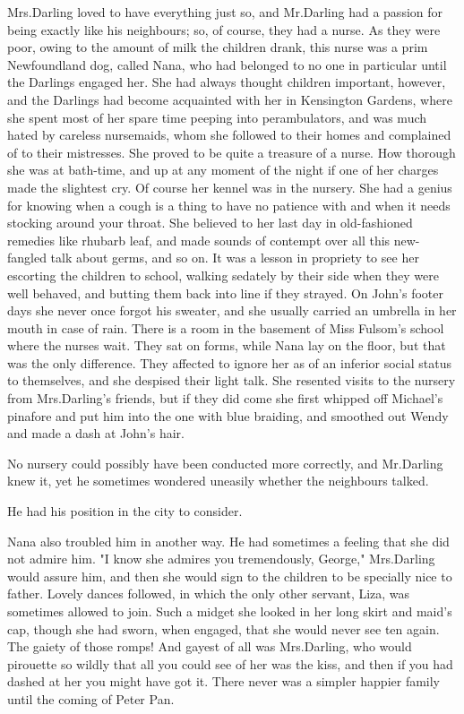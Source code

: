 Mrs.\@ Darling loved to have everything just so,
and Mr.\@ Darling had a passion for being exactly like his neighbours;
so, of course, they had a nurse.
As they were poor, owing to the amount of milk the children drank,
this nurse was a prim Newfoundland dog, called Nana,
who had belonged to no one in particular until the Darlings engaged her.
She had always thought children important, however,
and the Darlings had become acquainted with her in Kensington Gardens,
where she spent most of her spare time peeping into perambulators,
and was much hated by careless nursemaids,
whom she followed to their homes and complained of to their mistresses.
She proved to be quite a treasure of a nurse.
How thorough she was at bath-time,
and up at any moment of the night if one of her charges made the slightest cry.
Of course her kennel was in the nursery.
She had a genius for knowing when a cough is a thing to have no patience with
and when it needs stocking around your throat.
She believed to her last day in old-fashioned remedies like rhubarb leaf,
and made sounds of contempt over all this new-fangled talk about germs, and so on.
It was a lesson in propriety to see her escorting the children to school,
walking sedately by their side when they were well behaved,
and butting them back into line if they strayed.
On John's footer days she never once forgot his sweater,
and she usually carried an umbrella in her mouth in case of rain.
There is a room in the basement of Miss Fulsom's school where the nurses wait.
They sat on forms, while Nana lay on the floor, but that was the only difference.
They affected to ignore her as of an inferior social status to themselves,
and she despised their light talk.
She resented visits to the nursery from Mrs.\@ Darling's friends,
but if they did come she first whipped off Michael's pinafore and put him into the one with blue braiding,
and smoothed out Wendy and made a dash at John's hair.

No nursery could possibly have been conducted more correctly, and Mr.\@ Darling knew it,
yet he sometimes wondered uneasily whether the neighbours talked.

He had his position in the city to consider.

Nana also troubled him in another way.
He had sometimes a feeling that she did not admire him.
"I know she admires you tremendously, George," Mrs.\@ Darling would assure him,
and then she would sign to the children to be specially nice to father.
Lovely dances followed, in which the only other servant, Liza, was sometimes allowed to join.
Such a midget she looked in her long skirt and maid's cap,
though she had sworn, when engaged, that she would never see ten again.
The gaiety of those romps!
And gayest of all was Mrs.\@ Darling,
who would pirouette so wildly that all you could see of her was the kiss,
and then if you had dashed at her you might have got it.
There never was a simpler happier family until the coming of Peter Pan.

